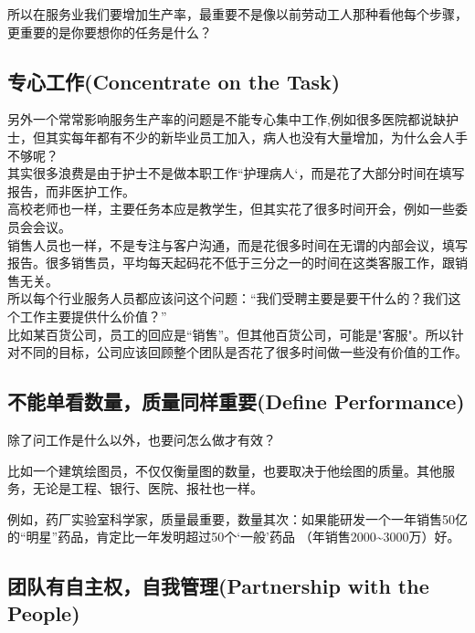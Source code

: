 所以在服务业我们要增加生产率，最重要不是像以前劳动工人那种看他每个步骤，更重要的是你要想你的任务是什么？\\

\hypertarget{ux4e13ux5fc3ux5de5ux4f5cconcentrate-on-the-task}{%
\subsection{专心工作(Concentrate on the
Task)}\label{ux4e13ux5fc3ux5de5ux4f5cconcentrate-on-the-task}}

另外一个常常影响服务生产率的问题是不能专心集中工作,例如很多医院都说缺护士，但其实每年都有不少的新毕业员工加入，病人也没有大量增加，为什么会人手不够呢？\\
其实很多浪费是由于护士不是做本职工作``护理病人`，而是花了大部分时间在填写报告，而非医护工作。\\

高校老师也一样，主要任务本应是教学生，但其实花了很多时间开会，例如一些委员会会议。\\
销售人员也一样，不是专注与客户沟通，而是花很多时间在无谓的内部会议，填写报告。很多销售员，平均每天起码花不低于三分之一的时间在这类客服工作，跟销售无关。\\
所以每个行业服务人员都应该问这个问题：``我们受聘主要是要干什么的？我们这个工作主要提供什么价值？''\\
比如某百货公司，员工的回应是``销售''。但其他百货公司，可能是"客服"。所以针对不同的目标，公司应该回顾整个团队是否花了很多时间做一些没有价值的工作。\\

\hypertarget{ux4e0dux80fdux5355ux770bux6570ux91cfux8d28ux91cfux540cux6837ux91cdux8981define-performance}{%
\subsection{不能单看数量，质量同样重要(Define
Performance)}\label{ux4e0dux80fdux5355ux770bux6570ux91cfux8d28ux91cfux540cux6837ux91cdux8981define-performance}}

除了问工作是什么以外，也要问怎么做才有效？

比如一个建筑绘图员，不仅仅衡量图的数量，也要取决于他绘图的质量。其他服务，无论是工程、银行、医院、报社也一样。

例如，药厂实验室科学家，质量最重要，数量其次：如果能研发一个一年销售50亿的``明星''药品，肯定比一年发明超过50个`一般'药品
（年销售2000\textasciitilde{}3000万）好。

\hypertarget{ux56e2ux961fux6709ux81eaux4e3bux6743ux81eaux6211ux7ba1ux7406partnership-with-the-people}{%
\subsection{团队有自主权，自我管理(Partnership with the
People)}\label{ux56e2ux961fux6709ux81eaux4e3bux6743ux81eaux6211ux7ba1ux7406partnership-with-the-people}}

